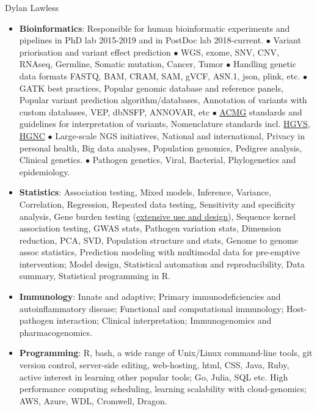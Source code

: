 \documentclass[11pt,a4paper]{article}
\begin{document}
\begin{cv}{Dylan Lawless}
\begin{itemize}[leftmargin=*]
\item \textbf{Bioinformatics}:
Responsible for human bioinformatic experiments and pipelines in PhD lab 2015-2019 and in PostDoc lab 2018-current.
$\bullet$ Variant priorisation and variant effect prediction
$\bullet$ WGS, exome, SNV, CNV, RNAseq, Germline, Somatic mutation, Cancer, Tumor
$\bullet$ Handling genetic data formats FASTQ, BAM, CRAM, SAM, gVCF, ASN.1, json, plink, etc.
$\bullet$ GATK best practices,
Popular genomic database and reference panels,
Popular variant prediction algorithm/databases,
Annotation of variants with custom databases, VEP, dbNSFP, ANNOVAR, etc
$\bullet$ \href{https://lawlessgenomics.com/topic/acgm-criteria-table-main}{ACMG} standards and guidelines for interpretation of variants,
Nomenclature standards incl. \href{http://varnomen.hgvs.org}{HGVS}, \href{https://www.genenames.org}{HGNC}
$\bullet$ Large-scale NGS initiatives, 
National and international,
Privacy in personal health,
Big data analyses,
Population genomics,	 
Pedigree analysis,
Clinical genetics.
$\bullet$ Pathogen genetics, Viral, Bacterial, Phylogenetics and epidemiology.

\item \textbf{Statistics}: 
	Association testing, 
	Mixed models, 
	Inference, 
	Variance,
	Correlation, 
	Regression,
	Repeated data testing,
	Sensitivity and specificity analysis,
	Gene burden testing (\href{https://lawlessgenomics.com/topic/burden-test}{extensive use and design}),
	Sequence kernel association testing,
	GWAS stats,
	Pathogen variation stats,
	Dimension reduction, PCA, SVD,
	Population structure and stats,
	Genome to genome assoc statistics,
	Prediction modeling with multimodal data for pre-emptive intervention;
	Model design,
	Statistical automation and reproducibility,
	Data summary, 
	Statistical programming in R.

\item \textbf{Immunology}:
	 Innate and adaptive;
	 Primary immunodeficiencies and autoinflammatory disease;
	 Functional and computational immunology;
	 Host-pathogen interaction;
	 Clinical interpretation;
	 Immunogenomics and pharmacogenomics.
	 
\item \textbf{Programming}:
	R, bash, a wide range of Unix/Linux command-line tools, git version control, server-side editing, web-hosting, html, CSS, Java, Ruby, active interest in learning other popular tools; Go, Julia, SQL etc. High performance computing scheduling, learning scalability with cloud-genomics; AWS, Azure, WDL, Cromwell, Dragon. 


\end{itemize}
\end{cv}
\end{document}

